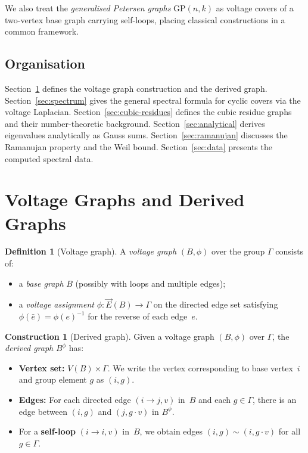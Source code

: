 \documentclass[11pt,a4paper]{article}
\theoremstyle{plain}
\theoremstyle{definition}
\newtheorem{definition}[theorem]{Definition}
\newtheorem{construction}[theorem]{Construction}
\theoremstyle{remark}
\newcommand{\GP}{\mathrm{GP}}
\begin{document}
We also treat the \emph{generalised Petersen graphs} $\GP(n,k)$ as voltage
covers of a two-vertex base graph carrying self-loops, placing classical
constructions in a common framework.

\subsection*{Organisation}

Section~\ref{sec:voltage} defines the voltage graph construction and the
derived graph. Section~\ref{sec:spectrum} gives the general spectral formula
for cyclic covers via the voltage Laplacian. Section~\ref{sec:cubic-residues}
defines the cubic residue graphs and their number-theoretic background.
Section~\ref{sec:analytical} derives eigenvalues analytically as Gauss sums.
Section~\ref{sec:ramanujan} discusses the Ramanujan property and the Weil
bound. Section~\ref{sec:data} presents the computed spectral data.


\section{Voltage Graphs and Derived Graphs}
\label{sec:voltage}

\begin{definition}[Voltage graph]
A \emph{voltage graph} $(B, \phi)$ over the group $\Gamma$ consists of:
\begin{itemize}
  \item a \emph{base graph} $B$ (possibly with loops and multiple edges);
  \item a \emph{voltage assignment} $\phi : \vec{E}(B) \to \Gamma$ on the
    directed edge set satisfying $\phi(\bar{e}) = \phi(e)^{-1}$ for the
    reverse of each edge~$e$.
\end{itemize}
\end{definition}

\begin{construction}[Derived graph]
\label{con:derived}
Given a voltage graph $(B, \phi)$ over $\Gamma$, the \emph{derived graph}
$B^\phi$ has:
\begin{itemize}
  \item \textbf{Vertex set:} $V(B) \times \Gamma$. We write the vertex
    corresponding to base vertex~$i$ and group element $g$ as $(i, g)$.
  \item \textbf{Edges:} For each directed edge $(i \to j, v)$ in~$B$ and
    each $g \in \Gamma$, there is an edge between $(i, g)$ and
    $(j, g \cdot v)$ in $B^\phi$.
  \item For a \textbf{self-loop} $(i \to i, v)$ in~$B$, we obtain edges
    $(i, g) \sim (i, g \cdot v)$ for all $g \in \Gamma$.
\end{itemize}
\end{construction}
\end{document}
